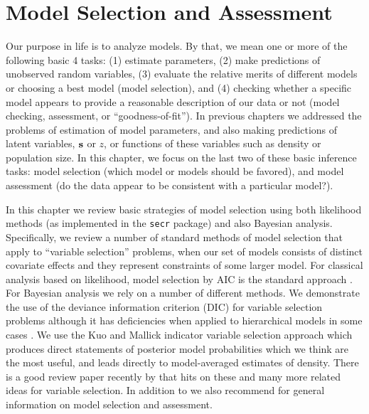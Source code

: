 \chapter{
Model Selection and Assessment
}
\label{chapt.gof}

\vspace{.3in}

Our purpose in life is to analyze models. By that, we mean one or more
of the following basic 4 tasks: (1) estimate parameters, (2) make predictions
of unobserved random variables, (3) evaluate the
relative merits of different models or choosing a best model (model
selection), and (4)  checking whether a specific model appears to provide a
reasonable description of our data or not (model checking, assessment,
or ``goodness-of-fit'').  In previous chapters we
addressed the problems of estimation of model parameters, 
and also making
predictions of latent variables, ${\bf s}$ or $z$, or
functions of these variables such as density or population size.
In this chapter, we focus on the last two of these basic
inference tasks: model selection (which model or models should be
favored), and model assessment (do the data appear to be consistent
with a particular model?).


In this chapter we review  basic strategies of model selection 
using both likelihood methods (as
implemented in the \mbox{\tt secr} package) and also Bayesian
analysis.
Specifically,
we review a number of standard methods of model selection that apply
to ``variable selection'' problems, when our set of models
consists of distinct covariate effects and they represent constraints
of some larger model.
For classical analysis based on likelihood, model selection by
AIC is the standard approach \citep{burnham_anderson:2002}.  For
Bayesian analysis we rely on a number of different methods.  We
demonstrate the use of the deviance information criterion (DIC)
\citep{spiegelhalter_etal:2002} for variable selection problems
although it has deficiencies when applied to hierarchical models in
some cases \citep{millar:2009}. 
We use the
Kuo and Mallick indicator variable selection approach
\citep{kuo_mallick:1998} which
produces direct statements
of posterior model probabilities which we think are the most useful,
and leads directly to model-averaged estimates of density.  There is a
good review paper recently by \citet{ohara_sillanpaa:2009} that hits
on these and many more related ideas for variable selection.
 In addition to \citet{ohara_sillanpaa:2009} we
also recommend \citet[][Chapt. 7]{link_barker:2010} for general
information on model selection and assessment.

